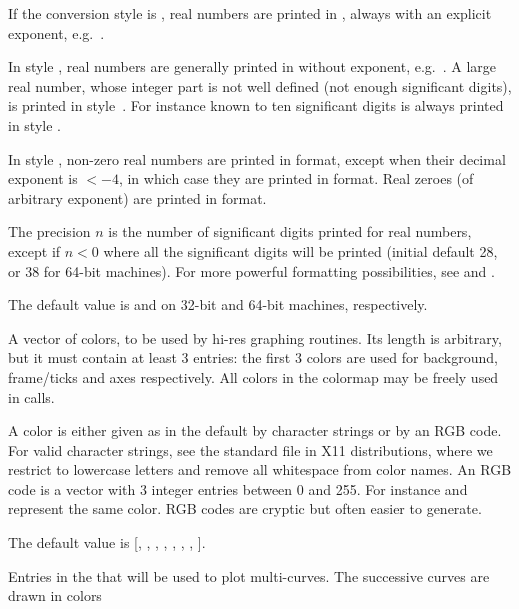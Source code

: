 \item If the conversion style is , real numbers are printed in
, always with an explicit exponent,
e.g.~.

\item In style , real numbers are generally printed in  without exponent, e.g.~. A large
real number, whose integer part is not well defined (not enough significant
digits), is printed in style~. For instance  known to
ten significant digits is always printed in style .

\item In style , non-zero real numbers are printed in  format,
except when their decimal exponent is $< -4$, in which case they are printed in
 format. Real zeroes (of arbitrary exponent) are printed in 
format.

The precision $n$ is the number of significant digits printed for real
numbers, except if $n<0$ where all the significant digits will be printed
(initial default 28, or 38 for 64-bit machines). For more powerful formatting
possibilities, see  and .

The default value is  and  on 32-bit and
64-bit machines, respectively.

\label{se:def,graphcolormap}
A vector of colors, to be
used by hi-res graphing routines. Its length is arbitrary, but it must
contain at least 3 entries: the first 3 colors are used for background,
frame/ticks and axes respectively. All colors in the colormap may be freely
used in  calls.

A color is either given as in the default by character strings or by an RGB
code. For valid character strings, see the standard  file in X11
distributions, where we restrict to lowercase letters and remove all
whitespace from color names. An RGB code is a vector with 3 integer entries
between 0 and 255. For instance \kbd{[250, 235, 215]} and
 represent the same color. RGB codes are cryptic but
often easier to generate.

The default value is [, , ,
, , , ,
].

\label{se:def,graphcolors}
Entries in the
 that will be used to plot multi-curves. The successive
curves are drawn in colors

